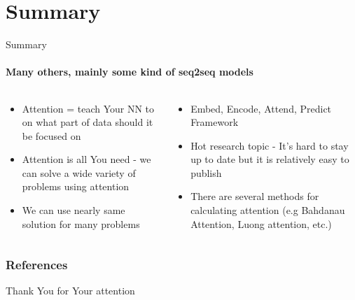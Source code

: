 \documentclass{beamer}
\begin{document}
\section{Summary}
\begin{frame}{Summary}
\framesubtitle{Many others, mainly some kind of seq2seq models}

\begin{columns}
\begin{column}{0.5\textwidth}
    \begin{itemize}
    \item Attention = teach Your NN to on what part of data should it be focused on\pause
    
    \item Attention is all You need - we can solve a wide variety of problems using attention \pause
    
    \item We can use nearly same solution for many problems\pause
    
    \end{itemize}   
\end{column}
\begin{column}{0.5\textwidth}
    \begin{itemize}
    \item Embed, Encode, Attend, Predict Framework\pause
    
    \item Hot research topic - It's hard to stay up to date but it is relatively easy to publish\pause
    
    
    \item There are several methods for calculating attention (e.g Bahdanau Attention, Luong attention, etc.)
    
    \end{itemize} 

\end{column}
\end{columns}
    
\end{frame}


\begin{frame}[allowframebreaks]
        \frametitle{References}
        
        
\end{frame}





\begin{frame}
\huge{\centerline{Thank You for Your attention}}
\end{frame}
\end{document}
